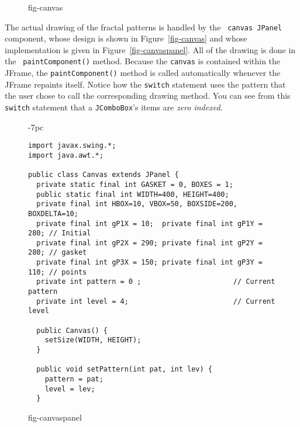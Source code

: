 \begin{figure}[tb]
 {fig-canvas}

\end{figure}

The actual drawing of the fractal patterns is handled by the {\tt
canvas JPanel} component, whose design is shown in
Figure~\ref{fig-canvas} and whose implementation is given in
Figure~\ref{fig-canvaspanel}.  All of the drawing is done in the {\tt
paintComponent()} method.  Because the {\tt canvas} is contained
within the JFrame, the {\tt paintComponent()} method is called
automatically whenever the JFrame repaints itself.  Notice how the
{\tt switch} statement uses the pattern that
the user chose to call the corresponding drawing method.   You can see
from this {\tt switch} statement that a {\tt JComboBox}'s items are
{\it zero indexed}.

\begin{figure}[h!]
\jjjprogstart
\begin{jjjlistingleft}[33pc]{-7pc}
\begin{lstlisting}
import javax.swing.*;
import java.awt.*;

public class Canvas extends JPanel {
  private static final int GASKET = 0, BOXES = 1;
  public static final int WIDTH=400, HEIGHT=400;
  private final int HBOX=10, VBOX=50, BOXSIDE=200, BOXDELTA=10;
  private final int gP1X = 10;  private final int gP1Y = 280; // Initial
  private final int gP2X = 290; private final int gP2Y = 280; // gasket
  private final int gP3X = 150; private final int gP3Y = 110; // points
  private int pattern = 0 ;                      // Current pattern
  private int level = 4;                         // Current level

  public Canvas() {
    setSize(WIDTH, HEIGHT);
  }

  public void setPattern(int pat, int lev) {
    pattern = pat;
    level = lev;
  }
\end{lstlisting}
\end{jjjlistingleft}
{fig-canvaspanel}
\end{figure}


